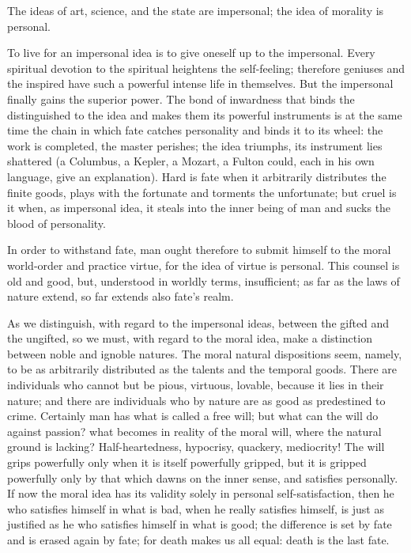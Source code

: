 \documentclass[12pt,a4paper,openany]{book}
\newcommand{\opage}[1]{\marginnote{\footnotesize\textit{[#1]}}}
\begin{document}
The ideas of art, science, and the state are
impersonal; the idea of morality is personal.

To live for an impersonal idea is to give
oneself up to the impersonal. Every spiritual devotion
to the spiritual heightens the self-feeling; therefore
geniuses and the inspired have such a powerful
intense life in themselves. But the impersonal
finally gains the superior power. The bond of
inwardness that binds the distinguished to the idea and
makes them its powerful instruments is at the same time
the chain in which fate catches personality  %
and binds it to its wheel: the work
is completed, the master perishes; the idea
triumphs, its instrument lies shattered (a
Columbus, a Kepler, a Mozart, a Fulton
could, each in his own language, give an explanation).
Hard is fate when it arbitrarily distributes
the finite goods, plays with the fortunate
and torments the unfortunate; but cruel is it
when, as impersonal idea, it steals into
\setcounter{footnote}{0}%
\opage{10}the inner being of man and sucks the blood of personality.

In order to withstand fate, man ought therefore
to submit himself to the moral world-order
and practice virtue, for the idea of virtue is
personal. This counsel is old and good,
but, understood in worldly terms, insufficient; as far
as the laws of nature extend, so far extends also fate's
realm.

As we distinguish, with regard to the impersonal
ideas, between the gifted and the ungifted,
so we must, with regard to the moral
idea, make a distinction between noble and ignoble natures.
The moral natural dispositions seem, namely,
to be as arbitrarily distributed as the talents
and the temporal goods. There are individuals
who cannot but be pious,
virtuous, lovable, because it lies in their nature;
and there are individuals who by nature
are as good as predestined to crime.
Certainly man has what is called a free
will; but what can the will do against passion?
what becomes in reality of
the moral will, where the natural ground
is lacking? Half-heartedness, hypocrisy, quackery,
\setcounter{footnote}{0}%
\opage{11}mediocrity! The will grips powerfully only when it is
itself powerfully gripped, but it is gripped powerfully only
by that which dawns on the inner sense,
and satisfies personally. If now the moral
idea has its validity solely in personal
self-satisfaction, then he who
satisfies himself in what is bad, when he really
satisfies himself, is just as justified as he
who satisfies himself in what is good; the difference
is set by fate and is erased again by fate;
for death makes us all equal: death is
the last fate.
\end{document}
